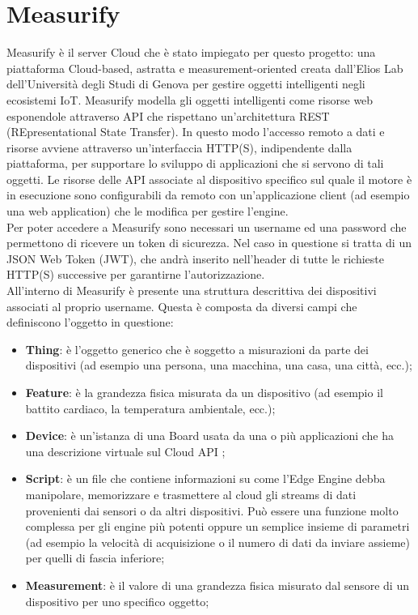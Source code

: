 \section{Measurify}
Measurify è il server Cloud che è stato impiegato per questo progetto: una piattaforma Cloud-based, astratta e measurement-oriented creata dall'Elios Lab dell'Università degli Studi di Genova per gestire oggetti intelligenti negli ecosistemi IoT. Measurify modella gli oggetti intelligenti come risorse web esponendole attraverso API che rispettano un'architettura REST (REpresentational State Transfer). In questo modo l'accesso remoto a dati e risorse avviene attraverso un'interfaccia HTTP(S), indipendente dalla piattaforma, per supportare lo sviluppo di applicazioni che si servono di tali oggetti. Le risorse delle API associate al dispositivo specifico sul quale il motore è in esecuzione sono configurabili da remoto con un'applicazione client (ad esempio una web application) che le modifica per gestire l'engine. \\
Per poter accedere a Measurify sono necessari un username ed una password che permettono di ricevere un token di sicurezza. Nel caso in questione si tratta di un JSON Web Token (JWT), che andrà inserito nell'header di tutte le richieste HTTP(S) successive per garantirne l'autorizzazione.\\
All'interno di Measurify è presente una struttura descrittiva dei dispositivi associati al proprio username. Questa è composta da diversi campi che definiscono l'oggetto in questione:
\begin{itemize}
	\item \textbf{Thing}: è  l'oggetto generico che è soggetto a misurazioni da parte dei dispositivi (ad esempio una persona, una macchina, una casa, una città, ecc.);
	\item \textbf{Feature}: è la grandezza fisica misurata da un dispositivo (ad esempio il battito cardiaco, la temperatura ambientale, ecc.);
	\item \textbf{Device}: è un'istanza di una Board usata da una o più applicazioni che
	ha una descrizione virtuale sul Cloud API ;
	\item \textbf{Script}: è un file che contiene informazioni su come l'Edge Engine debba manipolare, memorizzare e trasmettere al cloud gli streams di dati provenienti dai sensori o da altri dispositivi. Può essere una funzione molto complessa per gli engine più potenti oppure un semplice insieme di parametri (ad esempio la velocità di acquisizione o il numero di dati da inviare assieme) per quelli di fascia inferiore;
	\item \textbf{Measurement}: è il valore di una grandezza fisica misurato dal sensore
	di un dispositivo per uno specifico oggetto;
\end{itemize}
\newpage
